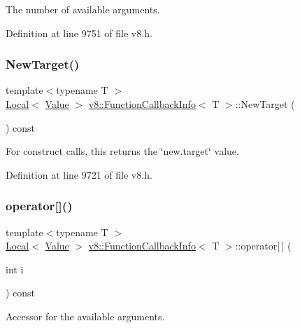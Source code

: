 The number of available arguments. 

Definition at line 9751 of file v8.\+h.

\mbox{\label{classv8_1_1FunctionCallbackInfo_aa04f4c5c984db26a90b591f34550e6fa}} 
\subsubsection{\texorpdfstring{New\+Target()}{NewTarget()}}
{\footnotesize\ttfamily template$<$typename T $>$ \\
\mbox{\hyperlink{classv8_1_1Local}{Local}}$<$ \mbox{\hyperlink{classv8_1_1Value}{Value}} $>$ \mbox{\hyperlink{classv8_1_1FunctionCallbackInfo}{v8\+::\+Function\+Callback\+Info}}$<$ T $>$\+::New\+Target (\begin{DoxyParamCaption}{ }\end{DoxyParamCaption}) const}

For construct calls, this returns the \char`\"{}new.\+target\char`\"{} value. 

Definition at line 9721 of file v8.\+h.

\mbox{\label{classv8_1_1FunctionCallbackInfo_a77dce5cad7b198c4181a522e9e0ab10f}} 
\subsubsection{\texorpdfstring{operator[]()}{operator[]()}}
{\footnotesize\ttfamily template$<$typename T $>$ \\
\mbox{\hyperlink{classv8_1_1Local}{Local}}$<$ \mbox{\hyperlink{classv8_1_1Value}{Value}} $>$ \mbox{\hyperlink{classv8_1_1FunctionCallbackInfo}{v8\+::\+Function\+Callback\+Info}}$<$ T $>$\+::operator\mbox{[}$\,$\mbox{]} (\begin{DoxyParamCaption}\item[{int}]{i }\end{DoxyParamCaption}) const}

Accessor for the available arguments. 

